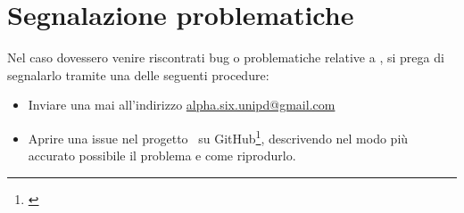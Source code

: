 \section{Segnalazione problematiche}

Nel caso dovessero venire riscontrati bug o problematiche relative a \progetto, si prega di segnalarlo tramite una delle seguenti procedure:
\begin{itemize}
    \item Inviare una mai all'indirizzo \href{mailto:alpha.six.unipd@gmail.com}{alpha.six.unipd@gmail.com}
    \item Aprire una issue nel progetto \progetto\ su GitHub\footnote{\url{}}, descrivendo nel modo più accurato possibile il problema e come riprodurlo.
\end{itemize}
